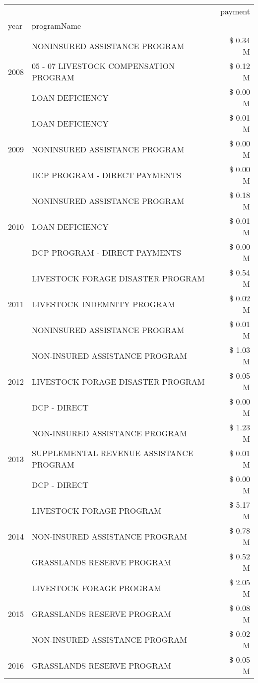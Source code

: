 \begin{tabular}{llr}
\toprule
 &  & payment \\
year & programName &  \\
\midrule
\multirow[t]{3}{*}{2008} & NONINSURED ASSISTANCE PROGRAM & \$ 0.34 M \\
 & 05 - 07 LIVESTOCK COMPENSATION PROGRAM & \$ 0.12 M \\
 & LOAN DEFICIENCY & \$ 0.00 M \\
\cline{1-3}
\multirow[t]{3}{*}{2009} & LOAN DEFICIENCY & \$ 0.01 M \\
 & NONINSURED ASSISTANCE PROGRAM & \$ 0.00 M \\
 & DCP PROGRAM - DIRECT PAYMENTS & \$ 0.00 M \\
\cline{1-3}
\multirow[t]{3}{*}{2010} & NONINSURED ASSISTANCE PROGRAM & \$ 0.18 M \\
 & LOAN DEFICIENCY & \$ 0.01 M \\
 & DCP PROGRAM - DIRECT PAYMENTS & \$ 0.00 M \\
\cline{1-3}
\multirow[t]{3}{*}{2011} & LIVESTOCK FORAGE DISASTER PROGRAM & \$ 0.54 M \\
 & LIVESTOCK INDEMNITY PROGRAM & \$ 0.02 M \\
 & NONINSURED ASSISTANCE PROGRAM & \$ 0.01 M \\
\cline{1-3}
\multirow[t]{3}{*}{2012} & NON-INSURED ASSISTANCE PROGRAM & \$ 1.03 M \\
 & LIVESTOCK FORAGE DISASTER PROGRAM & \$ 0.05 M \\
 & DCP - DIRECT & \$ 0.00 M \\
\cline{1-3}
\multirow[t]{3}{*}{2013} & NON-INSURED ASSISTANCE PROGRAM & \$ 1.23 M \\
 & SUPPLEMENTAL REVENUE ASSISTANCE PROGRAM & \$ 0.01 M \\
 & DCP - DIRECT & \$ 0.00 M \\
\cline{1-3}
\multirow[t]{3}{*}{2014} & LIVESTOCK FORAGE PROGRAM & \$ 5.17 M \\
 & NON-INSURED ASSISTANCE PROGRAM & \$ 0.78 M \\
 & GRASSLANDS RESERVE PROGRAM & \$ 0.52 M \\
\cline{1-3}
\multirow[t]{3}{*}{2015} & LIVESTOCK FORAGE PROGRAM & \$ 2.05 M \\
 & GRASSLANDS RESERVE PROGRAM & \$ 0.08 M \\
 & NON-INSURED ASSISTANCE PROGRAM & \$ 0.02 M \\
\cline{1-3}
\multirow[t]{3}{*}{2016} & GRASSLANDS RESERVE PROGRAM & \$ 0.05 M \\

\end{tabular}
